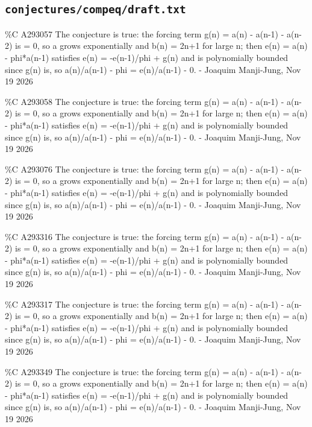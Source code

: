 \subsection*{\texttt{conjectures/compeq/draft.txt}}
{\small\raggedright\ttfamily
\%C A293057 The conjecture is true: the forcing term g(n) = a(n) - a(n-1) - a(n-2) is = 0, so a grows exponentially and b(n) = 2n+1 for large n; then e(n) = a(n) - phi*a(n-1) satisfies e(n) = -e(n-1)/phi + g(n) and is polynomially bounded since g(n) is, so a(n)/a(n-1) - phi = e(n)/a(n-1) - 0. - Joaquim Manji-Jung, Nov 19 2026\par
\%C A293058 The conjecture is true: the forcing term g(n) = a(n) - a(n-1) - a(n-2) is = 0, so a grows exponentially and b(n) = 2n+1 for large n; then e(n) = a(n) - phi*a(n-1) satisfies e(n) = -e(n-1)/phi + g(n) and is polynomially bounded since g(n) is, so a(n)/a(n-1) - phi = e(n)/a(n-1) - 0. - Joaquim Manji-Jung, Nov 19 2026\par
\%C A293076 The conjecture is true: the forcing term g(n) = a(n) - a(n-1) - a(n-2) is = 0, so a grows exponentially and b(n) = 2n+1 for large n; then e(n) = a(n) - phi*a(n-1) satisfies e(n) = -e(n-1)/phi + g(n) and is polynomially bounded since g(n) is, so a(n)/a(n-1) - phi = e(n)/a(n-1) - 0. - Joaquim Manji-Jung, Nov 19 2026\par
\%C A293316 The conjecture is true: the forcing term g(n) = a(n) - a(n-1) - a(n-2) is = 0, so a grows exponentially and b(n) = 2n+1 for large n; then e(n) = a(n) - phi*a(n-1) satisfies e(n) = -e(n-1)/phi + g(n) and is polynomially bounded since g(n) is, so a(n)/a(n-1) - phi = e(n)/a(n-1) - 0. - Joaquim Manji-Jung, Nov 19 2026\par
\%C A293317 The conjecture is true: the forcing term g(n) = a(n) - a(n-1) - a(n-2) is = 0, so a grows exponentially and b(n) = 2n+1 for large n; then e(n) = a(n) - phi*a(n-1) satisfies e(n) = -e(n-1)/phi + g(n) and is polynomially bounded since g(n) is, so a(n)/a(n-1) - phi = e(n)/a(n-1) - 0. - Joaquim Manji-Jung, Nov 19 2026\par
\%C A293349 The conjecture is true: the forcing term g(n) = a(n) - a(n-1) - a(n-2) is = 0, so a grows exponentially and b(n) = 2n+1 for large n; then e(n) = a(n) - phi*a(n-1) satisfies e(n) = -e(n-1)/phi + g(n) and is polynomially bounded since g(n) is, so a(n)/a(n-1) - phi = e(n)/a(n-1) - 0. - Joaquim Manji-Jung, Nov 19 2026\par
}
